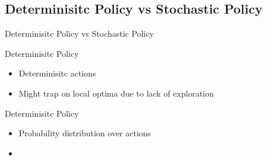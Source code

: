 \subsection{Determinisitc Policy vs Stochastic Policy}
\begin{frame}{Determinisitc Policy vs Stochastic Policy}
    \begin{block}{Determinisitc Policy}
        \begin{itemize}
        \item Determinisitc actions
        \item \alert{Might trap on local optima due to lack of exploration}
    \end{itemize}
    \end{block}
    
    \begin{block}{Determinisitc Policy}
        \begin{itemize}
        \item Probability distribution over actions
        \item \color{blue}{Avoid trap on local by  exploration}
    \end{itemize}
    \end{block}    
    
\end{frame}

